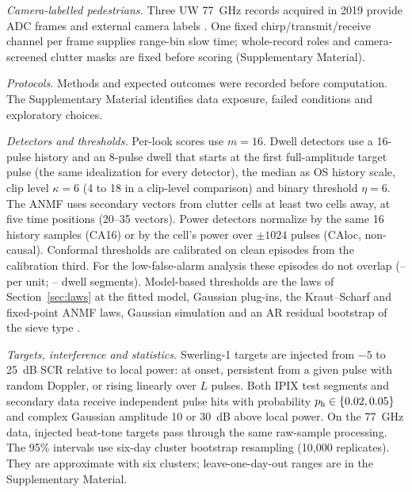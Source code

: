\documentclass[journal]{IEEEtran}
\begin{document}
\emph{Camera-labelled pedestrians.} Three UW 77~GHz records acquired in 2019 provide ADC frames and external camera labels \cite{uwraw2022,gao2021ramp}. One fixed chirp/transmit/receive channel per frame supplies range-bin slow time; whole-record roles and camera-screened clutter masks are fixed before scoring (Supplementary Material).

\emph{Protocols.} Methods and expected outcomes were recorded before computation. The Supplementary Material identifies data exposure, failed conditions and exploratory choices.

\emph{Detectors and thresholds.} Per-look scores use $m=16$. Dwell detectors use a 16-pulse history and an 8-pulse dwell that starts at the first full-amplitude target pulse (the same idealization for every detector), the median as OS history scale, clip level $\kappa=6$ (4 to 18 in a clip-level comparison) and binary threshold $\eta=6$. The ANMF uses secondary vectors from clutter cells at least two cells away, at five time positions (20--35 vectors). Power detectors normalize by the same 16 history samples (CA16) or by the cell's power over $\pm1024$ pulses (CAloc, non-causal). Conformal thresholds are calibrated on clean episodes from the calibration third. For the low-false-alarm analysis these episodes do not overlap (\LowCalMin--\LowCalMax{} per unit; \DwellCalMin--\DwellCalMax{} dwell segments). Model-based thresholds are the laws of Section~\ref{sec:laws} at the fitted model, Gaussian plug-ins, the Kraut--Scharf and fixed-point ANMF laws, Gaussian simulation and an AR residual bootstrap of the sieve type \cite{qu2024sieve}.

\emph{Targets, interference and statistics.} Swerling-1 targets are injected from $-5$ to 25~dB SCR relative to local power: at onset, persistent from a given pulse with random Doppler, or rising linearly over $L$ pulses. Both IPIX test segments and secondary data receive independent pulse hits with probability $p_{\rm h}\in\{0.02,0.05\}$ and complex Gaussian amplitude 10 or 30~dB above local power. On the 77~GHz data, injected beat-tone targets pass through the same raw-sample processing. The 95\% intervals use six-day cluster bootstrap resampling (10,000 replicates). They are approximate with six clusters; leave-one-day-out ranges are in the Supplementary Material.
\end{document}
